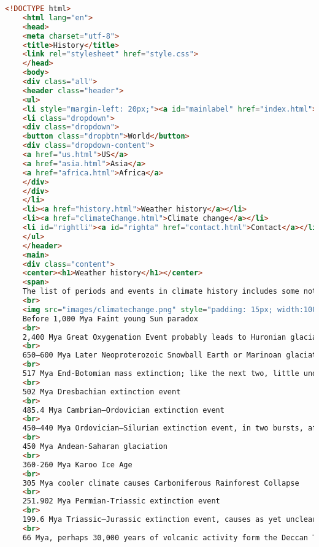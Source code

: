 \begin{lstlisting}[language=HTML,caption=Исходный код страницы History]
    <!DOCTYPE html>
    <html lang="en">
    <head>
    <meta charset="utf-8">
    <title>History</title>
    <link rel="stylesheet" href="style.css">
    </head>
    <body>
    <div class="all">
    <header class="header">
    <ul>
    <li style="margin-left: 20px;"><a id="mainlabel" href="index.html">Weather.org</a></li>
    <li class="dropdown">
    <div class="dropdown">
    <button class="dropbtn">World</button>
    <div class="dropdown-content">
    <a href="us.html">US</a>
    <a href="asia.html">Asia</a>
    <a href="africa.html">Africa</a>
    </div>
    </div>
    </li>
    <li><a href="history.html">Weather history</a></li>
    <li><a href="climateChange.html">Climate change</a></li>
    <li id="rightli"><a id="righta" href="contact.html">Contact</a></li>
    </ul>
    </header>
    <main>
    <div class="content">
    <center><h1>Weather history</h1></center>
    <span>
    The list of periods and events in climate history includes some notable climate events known to paleoclimatology. Knowledge of precise climatic events decreases as the record goes further back in time. The timeline of glaciation covers ice ages specifically, which tend to have their own names for phases, often with different names used for different parts of the world. The names for earlier periods and events come from geology and paleontology. The marine isotope stages (MIS) are often used to express dating within the Quaternary.
    <br>
    <img src="images/climatechange.png" style="padding: 15px; width:100%; ">
    Before 1,000 Mya Faint young Sun paradox
    <br>
    2,400 Mya Great Oxygenation Event probably leads to Huronian glaciation perhaps covering the whole globe
    <br>
    650–600 Mya Later Neoproterozoic Snowball Earth or Marinoan glaciation, precursor to the Cambrian Explosion
    <br>
    517 Mya End-Botomian mass extinction; like the next two, little understood
    <br>
    502 Mya Dresbachian extinction event
    <br>
    485.4 Mya Cambrian–Ordovician extinction event
    <br>
    450–440 Mya Ordovician–Silurian extinction event, in two bursts, after cooling perhaps caused by tectonic plate movement
    <br>
    450 Mya Andean-Saharan glaciation
    <br>
    360-260 Mya Karoo Ice Age
    <br>
    305 Mya cooler climate causes Carboniferous Rainforest Collapse
    <br>
    251.902 Mya Permian-Triassic extinction event
    <br>
    199.6 Mya Triassic–Jurassic extinction event, causes as yet unclear
    <br>
    66 Mya, perhaps 30,000 years of volcanic activity form the Deccan Traps in India, Or a large meteor impact.

\end{lstlisting}
